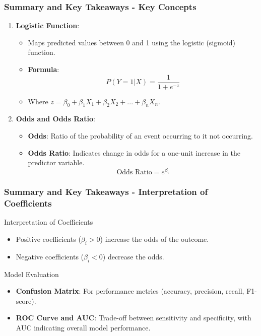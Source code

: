 \documentclass[aspectratio=169]{beamer}
\begin{document}
\begin{frame}[fragile]
    \frametitle{Summary and Key Takeaways - Key Concepts}
    \begin{enumerate}
        \item \textbf{Logistic Function}:
        \begin{itemize}
            \item Maps predicted values between 0 and 1 using the logistic (sigmoid) function.
            \item \textbf{Formula}:
            \begin{equation}
            P(Y=1 | X) = \frac{1}{1 + e^{-z}}
            \end{equation}
            \item Where \( z = \beta_0 + \beta_1X_1 + \beta_2X_2 + ... + \beta_nX_n \).
        \end{itemize}

        \item \textbf{Odds and Odds Ratio}:
        \begin{itemize}
            \item \textbf{Odds}: Ratio of the probability of an event occurring to it not occurring.
            \item \textbf{Odds Ratio}: Indicates change in odds for a one-unit increase in the predictor variable.
            \begin{equation}
            \text{Odds Ratio} = e^{\beta_i}
            \end{equation}
        \end{itemize}
    \end{enumerate}
\end{frame}

\begin{frame}[fragile]
    \frametitle{Summary and Key Takeaways - Interpretation of Coefficients}
    \begin{block}{Interpretation of Coefficients}
        \begin{itemize}
            \item Positive coefficients (\( \beta_i > 0 \)) increase the odds of the outcome.
            \item Negative coefficients (\( \beta_i < 0 \)) decrease the odds.
        \end{itemize}
    \end{block}
    
    \begin{block}{Model Evaluation}
        \begin{itemize}
            \item \textbf{Confusion Matrix}: For performance metrics (accuracy, precision, recall, F1-score).
            \item \textbf{ROC Curve and AUC}: Trade-off between sensitivity and specificity, with AUC indicating overall model performance.
        \end{itemize}
    \end{block}
\end{frame}
\end{document}
